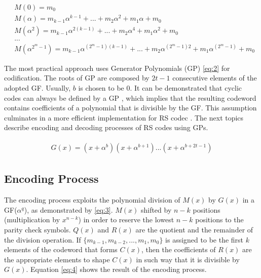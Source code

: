 \documentclass[conference]{IEEEtran}
\begin{document}
\begin{equation}
\label{eq:1}
\begin{aligned}
& \scriptscriptstyle M(0)=m_0 \\
& \scriptscriptstyle M(\alpha)=m_{k-1}\alpha^{k-1} + ... + m_{2}\alpha^{2} + m_1\alpha + m_0 \\
& \scriptscriptstyle M(\alpha^2)=m_{k-1}\alpha^{2(k-1)} + ... + m_{2}\alpha^{4} + m_1\alpha^{2} + m_0   \\
& \scriptscriptstyle ...\\
& \scriptscriptstyle M(\alpha^{2^m-1})=m_{k-1}\alpha^{(2^m-1)(k-1)} + ... + m_{2}\alpha^{(2^m-1)2} + m_1\alpha^{(2^m-1)} + m_0
\end{aligned}
\end{equation}

\par The most practical approach uses Generator Polynomials (GP) \eqref{eq:2} for codification. The roots of GP are composed by $2t - 1$ consecutive elements of the adopted GF. Usually, $b$ is chosen to be 0. It can be demonstrated that cyclic codes can always be defined by a GP \cite{b3}, which implies that the resulting codeword contains coefficients of a polynomial that is divisible by the GF. This assumption culminates in a more efficient implementation for RS codec \cite{b9}. The next topics describe encoding and decoding processes of RS codes using GPs.

\begin{align}
\label{eq:2}
\begin{gathered}
G(x) = (x + \alpha^b)(x + \alpha^{b + 1})...(x + \alpha^{b + 2t-1})
\end{gathered}
\end{align}

\subsection{Encoding Process} \label{encoding_process}

\par The encoding process exploits the polynomial division of $M(x)$ by $G(x)$ in a GF($\alpha^q$), as demonstrated by \eqref{eq:3}. $M(x)$ shifted by $n - k$ positions (multiplication by $x^{n - k}$) in order to reserve the lowest $n - k$ positions to the parity check symbols. $Q(x)$ and $R(x)$ are the quotient and the remainder of the division operation. If  $\{m_{k - 1}, m_{k - 2}, ..., m_1, m_0\}$ is assigned to be the first $k$ elements of the codeword that forms $C(x)$, then the coefficients of $R(x)$ are the appropriate elements to shape $C(x)$ in such way that it is divisible by $G(x)$. Equation \eqref{eq:4} shows the result of the encoding process.
\end{document}
